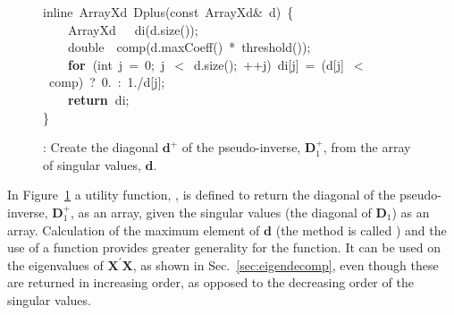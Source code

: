 \documentclass[shortnames,article,nojss]{jss}
\newcommand{\hlstd}[1]{\textcolor[rgb]{0,0,0}{#1}}
\newcommand{\hlnum}[1]{\textcolor[rgb]{0,0,0}{#1}}
\newcommand{\hlopt}[1]{\textcolor[rgb]{0,0,0}{#1}}
\newcommand{\hlkwa}[1]{\textcolor[rgb]{0.61,0.13,0.93}{\bf{#1}}}
\newcommand{\hlkwb}[1]{\textcolor[rgb]{0.13,0.54,0.13}{#1}}
\newcommand{\hlkwc}[1]{\textcolor[rgb]{0,0,1}{#1}}
\newcommand{\hlkwd}[1]{\textcolor[rgb]{0,0,0}{#1}}
\begin{document}
\begin{figure}[htb]
  \noindent
  \ttfamily
  \hlstd{}\hlkwc{inline\ }\hlstd{ArrayXd\ }\hlkwd{Dplus}\hlstd{}\hlopt{(}\hlstd{}\hlkwb{const\ }\hlstd{ArrayXd}\hlopt{\&\ }\hlstd{d}\hlopt{)\ \{}\hspace*{\fill}\\
  \hlstd{}\hlstd{\ \ \ \ }\hlstd{ArrayXd}\hlstd{\ \ \ }\hlstd{}\hlkwd{di}\hlstd{}\hlopt{(}\hlstd{d}\hlopt{.}\hlstd{}\hlkwd{size}\hlstd{}\hlopt{());}\hspace*{\fill}\\
  \hlstd{}\hlstd{\ \ \ \ }\hlstd{}\hlkwb{double}\hlstd{\ \ }\hlkwb{}\hlstd{}\hlkwd{comp}\hlstd{}\hlopt{(}\hlstd{d}\hlopt{.}\hlstd{}\hlkwd{maxCoeff}\hlstd{}\hlopt{()\ {*}\ }\hlstd{}\hlkwd{threshold}\hlstd{}\hlopt{());}\hspace*{\fill}\\
  \hlstd{}\hlstd{\ \ \ \ }\hlstd{}\hlkwa{for\ }\hlstd{}\hlopt{(}\hlstd{}\hlkwb{int\ }\hlstd{j\ }\hlopt{=\ }\hlstd{}\hlnum{0}\hlstd{}\hlopt{;\ }\hlstd{j\ }\hlopt{$<$\ }\hlstd{d}\hlopt{.}\hlstd{}\hlkwd{size}\hlstd{}\hlopt{();\ ++}\hlstd{j}\hlopt{)\ }\hlstd{di}\hlopt{{[}}\hlstd{j}\hlopt{{]}\ =\ (}\hlstd{d}\hlopt{{[}}\hlstd{j}\hlopt{{]}\ $<$\ }\hlstd{comp}\hlopt{)\ }\hlstd{?\ }\hlnum{0}\hlstd{}\hlopt{.\ :\ }\hlstd{}\hlnum{1}\hlstd{}\hlopt{./}\hlstd{d}\hlopt{{[}}\hlstd{j}\hlopt{{]};}\hspace*{\fill}\\
  \hlstd{}\hlstd{\ \ \ \ }\hlstd{}\hlkwa{return\ }\hlstd{di}\hlopt{;}\hspace*{\fill}\\
  \hlstd{}\hlopt{\}}\hlstd{}\hspace*{\fill}\\
  \mbox{}
  \normalfont
  \normalsize
  \caption{: Create the diagonal $\bm d^+$ of the pseudo-inverse, $\bm D_1^+$, from the array of singular values, $\bm d$.}
  \label{Dplus}
\end{figure}

In Figure~\ref{Dplus} a utility function, , is defined to
return the diagonal of the pseudo-inverse, $\bm D_1^+$, as an array,
given the singular values (the diagonal of $\bm D_1$) as an array.
Calculation of the maximum element of $\bm d$ (the method is called
) and the use of a  function
provides greater generality for the function.  It can be used on the
eigenvalues of $\bm X^\prime\bm X$, as shown in
Sec.~\ref{sec:eigendecomp}, even though these are returned in
increasing order, as opposed to the decreasing order of the singular
values.
\end{document}
